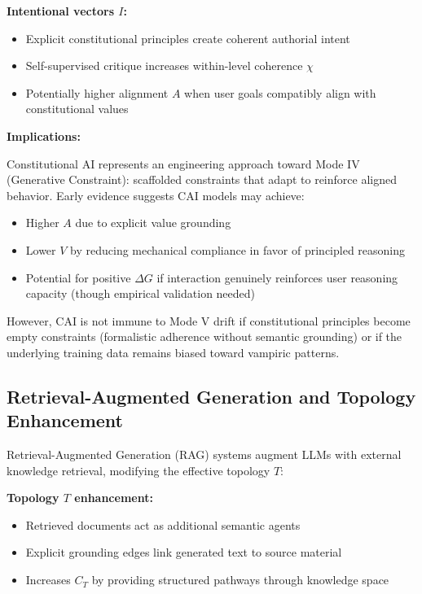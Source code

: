 \documentclass[12pt]{article}
\begin{document}
\textbf{Intentional vectors $I$:}
\begin{itemize}
\item Explicit constitutional principles create coherent authorial intent
\item Self-supervised critique increases within-level coherence $\chi$
\item Potentially higher alignment $A$ when user goals compatibly align with constitutional values
\end{itemize}

\textbf{Implications:}

Constitutional AI represents an engineering approach toward Mode IV (Generative Constraint): scaffolded constraints that adapt to reinforce aligned behavior. Early evidence suggests CAI models may achieve:
\begin{itemize}
\item Higher $A$ due to explicit value grounding
\item Lower $V$ by reducing mechanical compliance in favor of principled reasoning
\item Potential for positive $\Delta G$ if interaction genuinely reinforces user reasoning capacity (though empirical validation needed)
\end{itemize}

However, CAI is not immune to Mode V drift if constitutional principles become empty constraints (formalistic adherence without semantic grounding) or if the underlying training data remains biased toward vampiric patterns.

\subsection{Retrieval-Augmented Generation and Topology Enhancement}

Retrieval-Augmented Generation (RAG) systems \citep{lewis2020retrieval} augment LLMs with external knowledge retrieval, modifying the effective topology $T$:

\textbf{Topology $T$ enhancement:}
\begin{itemize}
\item Retrieved documents act as additional semantic agents
\item Explicit grounding edges link generated text to source material
\item Increases $C_T$ by providing structured pathways through knowledge space
\end{itemize}
\end{document}
